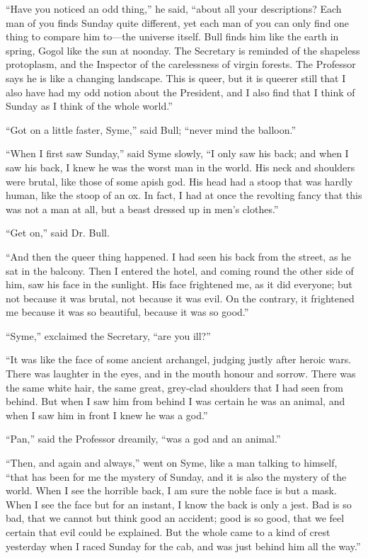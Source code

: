 \documentclass{book}
\begin{document}
“Have you noticed an odd thing,” he said, “about all your descriptions? Each man of you finds Sunday quite different, yet each man of you can only find one thing to compare him to—the universe itself. Bull finds him like the earth in spring, Gogol like the sun at noonday. The Secretary is reminded of the shapeless protoplasm, and the Inspector of the carelessness of virgin forests. The Professor says he is like a changing landscape. This is queer, but it is queerer still that I also have had my odd notion about the President, and I also find that I think of Sunday as I think of the whole world.”

“Got on a little faster, Syme,” said Bull; “never mind the balloon.”

“When I first saw Sunday,” said Syme slowly, “I only saw his back; and when I saw his back, I knew he was the worst man in the world. His neck and shoulders were brutal, like those of some apish god. His head had a stoop that was hardly human, like the stoop of an ox. In fact, I had at once the revolting fancy that this was not a man at all, but a beast dressed up in men’s clothes.”

“Get on,” said Dr. Bull.

“And then the queer thing happened. I had seen his back from the street, as he sat in the balcony. Then I entered the hotel, and coming round the other side of him, saw his face in the sunlight. His face frightened me, as it did everyone; but not because it was brutal, not because it was evil. On the contrary, it frightened me because it was so beautiful, because it was so good.”

“Syme,” exclaimed the Secretary, “are you ill?”

“It was like the face of some ancient archangel, judging justly after heroic wars. There was laughter in the eyes, and in the mouth honour and sorrow. There was the same white hair, the same great, grey-clad shoulders that I had seen from behind. But when I saw him from behind I was certain he was an animal, and when I saw him in front I knew he was a god.”

“Pan,” said the Professor dreamily, “was a god and an animal.”

“Then, and again and always,” went on Syme, like a man talking to himself, “that has been for me the mystery of Sunday, and it is also the mystery of the world. When I see the horrible back, I am sure the noble face is but a mask. When I see the face but for an instant, I know the back is only a jest. Bad is so bad, that we cannot but think good an accident; good is so good, that we feel certain that evil could be explained. But the whole came to a kind of crest yesterday when I raced Sunday for the cab, and was just behind him all the way.”
\end{document}
